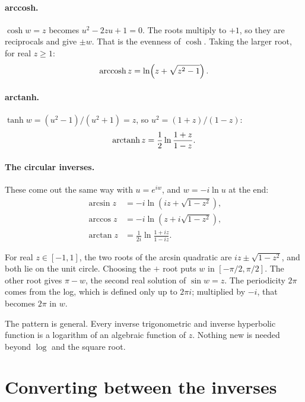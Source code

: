 \documentclass{essay}
\begin{document}
\paragraph{arccosh.}
$\cosh w = z$ becomes $u^2 - 2zu + 1 = 0$. The roots multiply to $+1$, so they
are reciprocals and give $\pm w$. That is the evenness of $\cosh$. Taking the
larger root, for real $z \ge 1$:
\[
  \operatorname{arccosh} z = \ln\!\left( z + \sqrt{z^2 - 1} \right).
\]

\paragraph{arctanh.}
$\tanh w = (u^2 - 1)/(u^2 + 1) = z$, so $u^2 = (1+z)/(1-z)$:
\[
  \operatorname{arctanh} z = \frac{1}{2} \ln \frac{1 + z}{1 - z}.
\]

\paragraph{The circular inverses.}
These come out the same way with $u = e^{iw}$, and $w = -i \ln u$ at the end:
\begin{align*}
  \arcsin z &= -i \ln\!\left( iz + \sqrt{1 - z^2} \right), \\
  \arccos z &= -i \ln\!\left( z + i\sqrt{1 - z^2} \right), \\
  \arctan z &= \frac{1}{2i} \ln \frac{1 + iz}{1 - iz}.
\end{align*}

For real $z \in [-1, 1]$, the two roots of the arcsin quadratic are
$iz\pm\sqrt{1-z^2}$, and both lie on the unit circle. Choosing the
$+$ root puts $w$ in $[-\pi/2, \pi/2]$. The other root gives $\pi - w$, the
second real solution of $\sin w = z$. The periodicity $2\pi$ comes from the log,
which is defined only up to $2\pi i$; multiplied by $-i$, that becomes $2\pi$ in
$w$.

The pattern is general. Every inverse trigonometric and inverse hyperbolic
function is a logarithm of an algebraic function of $z$. Nothing new is needed
beyond $\log$ and the square root.

\section{Converting between the inverses}
\end{document}
